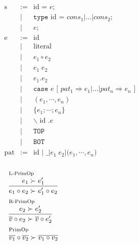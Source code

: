 \documentclass{standalone}
\begin{document}
$
\begin{array}{lcll}
\text{s} &:=& \text{id } \texttt{= } e \texttt{;} &\\
&|& \texttt{type }\text{id } \texttt{= } cons_1 \texttt{|} \dots \texttt{|} cons_2 \texttt{;} &\\ 
&|& e \texttt{;} &\\
\text{e} &:=& \text{id} &\\
&|& \text{literal} &\\
&|& e_1 \circ e_2 &\\
&|& e_1 \; e_2 &\\
&|& e_1 . e_2 &\\
&|& \texttt{case }e \texttt{ [ }pat_1 \Rightarrow e_1 \texttt{|} \dots \texttt{|} pat_n \Rightarrow e_n\texttt{ ]} &\\
&|& (e_1, \cdots, e_n) &\\
&|& \{e_1 ; \cdots ; e_n\} &\\
&|& \backslash \text{ id }\texttt{.} e &\\
&|& \texttt{TOP} &\\
&|& \texttt{BOT} &\\
\text{pat} &:=& \text{id } | \texttt{ \_ } | e_1 \; e_2 | \texttt{(}e_1,\cdots,e_n\texttt{)}&\\
\end{array}
$


$
\begin{array}{l}
  \begin{array}{l}{\scriptsize\text{L-PrimOp}}\\\infer{e_1 \circ e_2 \succ e_1' \circ e_2}{e_1 \succ e_1'} \end{array}\\[1.5em]

  \begin{array}{l}{\scriptsize\text{R-PrimOp}}\\\infer{\overline{v} \circ e_2 \succ \overline{v} \circ e_2'}{e_2 \succ e_2'} \end{array}\\[1.5em]

  \begin{array}{l}{\scriptsize\text{PrimOp}}\\\overline{v_1} \circ \overline{v_2} \succ \overline{v_1 \circ v_2}\end{array}\\[1.5em]
\end{array}
$
\end{document}
